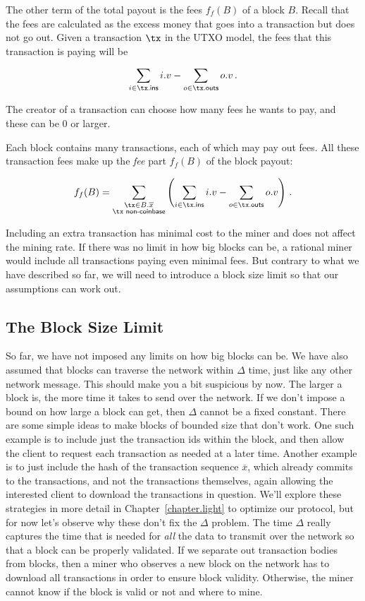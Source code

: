 The other term of the total payout is the fees $f_f(B)$ of a block $B$.
Recall that the fees are calculated as the excess money that goes into
a transaction but does not go out. Given a transaction $\tx$ in the UTXO
model, the fees that this transaction is paying will be

\[
   \sum_{i \in \tx\textsf{.ins}} i.v - \sum_{o \in \tx\textsf{.outs}} o.v\,.
\]

The creator of a transaction can choose how many fees he wants to pay,
and these can be $0$ or larger.

Each block contains many transactions, each of which may pay out fees. All
these transaction fees make up the \emph{fee} part $f_f(B)$ of the block payout:

\[
  f_f(B) = \sum_{\substack{\tx \in B.\overline{x}\\\tx \textsf{ non-coinbase}}}
           \left(\sum_{i \in \tx\textsf{.ins}} i.v - \sum_{o \in \tx\textsf{.outs}} o.v\right)\,.
\]

Including an extra transaction has minimal cost to the miner and does not affect the mining
rate. If there was no limit in how big blocks can be, a rational miner would include all
transactions paying even minimal fees. But contrary to what we have described so far,
we will need to introduce a block size limit so that our assumptions can work out.

\subsection*{The Block Size Limit}

So far, we have not imposed any limits on how big blocks can be. We have also assumed
that blocks can traverse the network within $\Delta$ time, just like any other network message.
This should make you a bit suspicious by now. The larger a block is, the more time it
takes to send over the network. If we don't impose a bound on how large a block can get,
then $\Delta$ cannot be a fixed constant. There are some simple ideas to make blocks of
bounded size that don't work. One such example is to include just the transaction ids
within the block, and then allow the client to request each transaction as needed at
a later time. Another example is to just include the hash of the transaction sequence
$\overline{x}$, which already commits to the transactions, and not the transactions
themselves, again allowing the interested client to download the transactions in question.
We'll explore these strategies in more detail in Chapter~\ref{chapter.light} to optimize
our protocol, but for now let's observe why these don't fix the $\Delta$ problem.
The time $\Delta$ really captures the time that is needed for \emph{all} the data
to transmit over the network so that a block can be properly validated. If we separate
out transaction bodies from blocks, then a miner who observes a new block on the network
has to download all transactions in order to ensure block validity. Otherwise, the
miner cannot know if the block is valid or not and where to mine.

